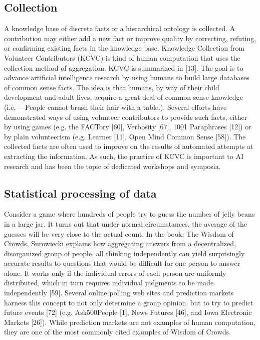 \documentclass{sig-alternate}
\begin{document}
\subsection*{Collection}
A knowledge base of discrete facts or a hierarchical ontology is collected. A contribution may either add a new fact or improve quality by correcting, refuting, or confirming existing facts in the knowledge base.
Knowledge Collection from Volunteer Contributors (KCVC) is kind of human computation that uses the collection method of aggregation. KCVC is summarized in [13]. The goal is to advance artificial intelligence research by using humans to build large databases of common sense facts. The idea is that humans, by way of their child development and adult lives, acquire a great deal of common sense knowledge (i.e. ―People cannot brush their hair with a table.). Several efforts have demonstrated ways of using volunteer contributors to provide such facts, either by using games (e.g. the FACTory [60], Verbosity [67], 1001 Paraphrases [12]) or by plain volunteerism (e.g. Learner [11], Open Mind Common Sense [58]). The collected facts are often used to improve on the results of automated attempts at extracting the information. As such, the practice of KCVC is important to AI research and has been the topic of dedicated workshops and symposia.
\subsection*{Statistical processing of data}
Consider a game where hundreds of people try to guess the number of jelly beans in a large jar. It turns out that under normal circumstances, the average of the guesses will be very close to the actual count.
In the book, The Wisdom of Crowds, Surowiecki explains how aggregating answers from a decentralized, disorganized group of people, all thinking independently can yield surprisingly accurate results to questions that would be difficult for one person to answer alone. It works only if the individual errors of each person are uniformly distributed, which in turn requires individual judgments to be made independently [59].
Several online polling web sites and prediction markets harness this concept to not only determine a group opinion, but to try to predict future events [72] (e.g. Ask500People [1], News Futures [46], and Iowa Electronic Markets [26]). While prediction markets are not examples of human computation, they are one of the most commonly cited examples of Wisdom of Crowds.
\end{document}
